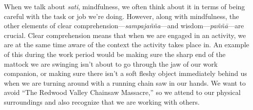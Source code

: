 When we talk about \emph{sati}, mindfulness, we often think about it in 
terms of being careful with the task or job we're doing. However, along 
with mindfulness, the other elements of clear 
comprehension---\emph{sampajañña}---and 
wisdom---\emph{paññā}---are crucial. Clear comprehension means that 
when we are engaged in an activity, we are at the same time aware of 
the context the activity takes place in. An example of this during the 
work period would be making sure the sharp end of the mattock we are 
swinging isn't about to go through the jaw of our work companion, or 
making sure there isn't a soft fleshy object immediately behind us when 
we are turning around with a running chain saw in our hands. We want to 
avoid ``The Redwood Valley Chainsaw Massacre,'' so we attend to our 
physical surroundings and also recognize that we are working with 
others.

